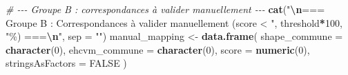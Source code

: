 \documentclass[
]{article}
\newenvironment{Shaded}{\begin{snugshade}}{\end{snugshade}}
\newcommand{\AttributeTok}[1]{\textcolor[rgb]{0.13,0.29,0.53}{#1}}
\newcommand{\CommentTok}[1]{\textcolor[rgb]{0.56,0.35,0.01}{\textit{#1}}}
\newcommand{\ConstantTok}[1]{\textcolor[rgb]{0.56,0.35,0.01}{#1}}
\newcommand{\DecValTok}[1]{\textcolor[rgb]{0.00,0.00,0.81}{#1}}
\newcommand{\FunctionTok}[1]{\textcolor[rgb]{0.13,0.29,0.53}{\textbf{#1}}}
\newcommand{\NormalTok}[1]{#1}
\newcommand{\OtherTok}[1]{\textcolor[rgb]{0.56,0.35,0.01}{#1}}
\newcommand{\SpecialCharTok}[1]{\textcolor[rgb]{0.81,0.36,0.00}{\textbf{#1}}}
\newcommand{\StringTok}[1]{\textcolor[rgb]{0.31,0.60,0.02}{#1}}
\begin{document}
\begin{Shaded}
\begin{Highlighting}[]
  \CommentTok{\# {-}{-}{-} Groupe B : correspondances à valider manuellement {-}{-}{-}}
  \FunctionTok{cat}\NormalTok{(}\StringTok{"}\SpecialCharTok{\textbackslash{}n}\StringTok{=== Groupe B : Correspondances à valider manuellement (score \textless{} "}\NormalTok{,}
\NormalTok{      threshold}\SpecialCharTok{*}\DecValTok{100}\NormalTok{, }\StringTok{"\%) ===}\SpecialCharTok{\textbackslash{}n}\StringTok{"}\NormalTok{, }\AttributeTok{sep =} \StringTok{""}\NormalTok{)}
\NormalTok{  manual\_mapping }\OtherTok{\textless{}{-}} \FunctionTok{data.frame}\NormalTok{(}
    \AttributeTok{shape\_commune =} \FunctionTok{character}\NormalTok{(}\DecValTok{0}\NormalTok{),}
    \AttributeTok{ehcvm\_commune =} \FunctionTok{character}\NormalTok{(}\DecValTok{0}\NormalTok{),}
    \AttributeTok{score =} \FunctionTok{numeric}\NormalTok{(}\DecValTok{0}\NormalTok{),}
    \AttributeTok{stringsAsFactors =} \ConstantTok{FALSE}
\NormalTok{  )}
  

\end{Highlighting}
\end{Shaded}
\end{document}
